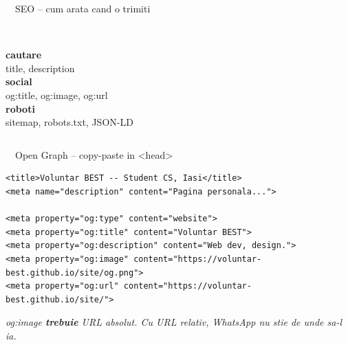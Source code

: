 \documentclass[aspectratio=169,11pt]{beamer}
\newcommand{\setaccent}[1]{\colorlet{accent}{#1}}
\newcommand{\code}[1]{{\ttfamily\small\color{accent!85!black}#1}}
\begin{document}
\setaccent{themeSeo}

\begin{frame}[c]{\textcolor{themeSeo}{\faShareSquare}\ \ SEO -- cum arata cand o trimiti}
  \begin{columns}[T,onlytextwidth]
    \centering
    {\color{themeSeo}\fontsize{60}{60}\selectfont\faSearch}\\[16pt]
    {\Large\bfseries cautare}\\[4pt]
    {\small\color{textDim}title, description}
    \centering
    {\color{themeSeo}\fontsize{60}{60}\selectfont\faComments}\\[16pt]
    {\Large\bfseries social}\\[4pt]
    {\small\color{textDim}og:title, og:image, og:url}
    \centering
    {\color{themeSeo}\fontsize{60}{60}\selectfont\faRobot}\\[16pt]
    {\Large\bfseries roboti}\\[4pt]
    {\small\color{textDim}sitemap, robots.txt, JSON-LD}
  \end{columns}
\end{frame}

\begin{frame}[fragile]{\textcolor{themeSeo}{\faShareSquare}\ \ Open Graph -- copy-paste in <head>}
\vspace{6pt}
\begin{lstlisting}[style=html]
<title>Voluntar BEST -- Student CS, Iasi</title>
<meta name="description" content="Pagina personala...">

<meta property="og:type" content="website">
<meta property="og:title" content="Voluntar BEST">
<meta property="og:description" content="Web dev, design.">
<meta property="og:image" content="https://voluntar-best.github.io/site/og.png">
<meta property="og:url" content="https://voluntar-best.github.io/site/">
\end{lstlisting}
\vspace{4pt}
{\footnotesize\color{textDim}\itshape \code{og:image} \textbf{trebuie} URL absolut. Cu URL relativ, WhatsApp nu stie de unde sa-l ia.}
\end{frame}
\end{document}
